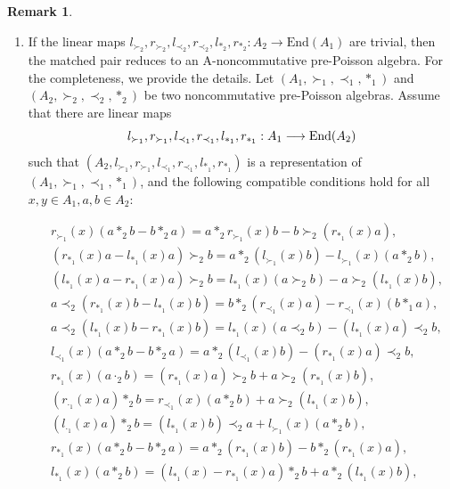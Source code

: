 \documentclass[12pt]{amsart}
\theoremstyle{definition}
\newtheorem{rmk}[thm]{Remark}
\begin{document}
\begin{rmk} \label{Ms} 
\begin{enumerate}
\item If the linear maps
 $l_{\succ_2},r_{\succ_2},l_{\prec_2},r_{\prec_2},l_{\ast_2},r_{\ast_2}: A_{2}\rightarrow \text{End}(A_1)$ are trivial, then the matched pair 
reduces to an A-noncommutative pre-Poisson algebra. 
For the completeness, we provide the details. Let $(A_{1},\succ_{1},\prec_{1},\ast_1)$ and
$(A_{2},\succ_{2},\prec_{2},\ast_2)$ be two noncommutative pre-Poisson algebras. Assume that there are linear maps
\begin{equation*}l_{\succ_1},r_{\succ_1},l_{\prec_1},r_{\prec_1},l_{\ast_1},r_{\ast_1}:A_1\longrightarrow \hbox{End}(A_2)\end{equation*}
 such that
$(A_2,l_{\succ_1},r_{\succ_1},l_{\prec_1},r_{\prec_1},l_{\ast_1},r_{\ast_1})$ 
is a representation of $(A_1,\succ_1,\prec_1,\ast_1)$,
and the following compatible conditions hold for all $x,y\in A_1,a,b\in A_2$:
\begin{small}
	\begin{align}
	&\label{ppmp eq1.22}r_{\succ_1}(x)(a\ast_{2} b-b\ast_{2} a)=a\ast_{2}r_{\succ_1}(x)b-b\succ_{2}(r_{\ast_1}(x)a),
\\&\label{ppmp eq1.23}(r_{\ast_1}(x)a-l_{\ast_1}(x)a)\succ_2 b=a\ast_2(l_{\succ_1}(x)b)-l_{\succ_1}(x)(a\ast_2 b),
\\&\label{ppmp eq1.24}(l_{\ast_1}(x)a-r_{\ast_1}(x)a)\succ_2 b=l_{\ast_1}(x)(a\succ_2 b)-a\succ_2(l_{\ast_1}(x)b),
\\&\label{ppmp eq1.25}a\prec_2(r_{\ast_1}(x)b-l_{\ast_1}(x)b)=b\ast_2(r_{\prec_1}(x)a)-r_{\prec_1}(x)(b\ast_1 a),
\\&\label{ppmp eq1.26}a\prec_2(l_{\ast_1}(x)b-r_{\ast_1}(x)b)=l_{\ast_1}(x)(a\prec_2b)-(l_{\ast_1}(x)a)\prec_2 b,
\\&\label{ppmp eq1.27}l_{\prec_1}(x)(a\ast_2b-b\ast_2a)=a\ast_2(l_{\prec_1}(x)b)-(r_{\ast_1}(x)a)\prec_2b,
\\&\label{ppmp eq1.28}r_{\ast_1}(x)(a\cdot_2b)=(r_{\ast_1}(x)a)\succ_2 b+a\succ_2(r_{\ast_1}(x)b),
\\&\label{ppmp eq1.29}(r_{\cdot_1}(x)a)\ast_2b=r_{\prec_1}(x)(a\ast_2b)+a\succ_2(l_{\ast_1}(x)b),
\\&\label{ppmp eq1.30}(l_{\cdot_1}(x)a)\ast_2b=(l_{\ast_1}(x)b)\prec_2 a+l_{\succ_1}(x)(a\ast_2b),
\\&\label{Dl1}r_{\ast_1}(x)(a\ast_{2} b-b\ast_{2} a)=a\ast_2(r_{\ast_1}(x)b)-b\ast_2(r_{\ast_1}(x)a),
\\&\label{Dl2}l_{\ast_1}(x)(a\ast_2 b)=(l_{\ast_1}(x)-r_{\ast_1}(x)a)\ast_2 b+a\ast_2(l_{\ast_1}(x)b),

\end{align}
\end{small}
\end{enumerate}
\end{rmk}
\end{document}
